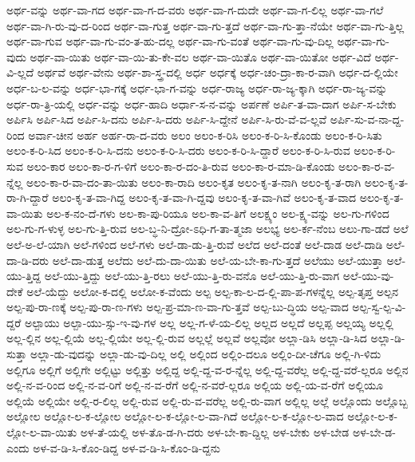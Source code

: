 {ಅರ್ಥ-ವನ್ನು
ಅರ್ಥ-ವಾ-ಗದ
ಅರ್ಥ-ವಾ-ಗ-ದ-ವರು
ಅರ್ಥ-ವಾ-ಗ-ದುದೇ
ಅರ್ಥ-ವಾ-ಗ-ಲಿಲ್ಲ
ಅರ್ಥ-ವಾ-ಗಲೆ
ಅರ್ಥ-ವಾ-ಗಿ-ರು-ವು-ದ-ರಿಂದ
ಅರ್ಥ-ವಾ-ಗುತ್ತ
ಅರ್ಥ-ವಾ-ಗು-ತ್ತದೆ
ಅರ್ಥ-ವಾ-ಗು-ತ್ತಾ-ನೆಯೇ
ಅರ್ಥ-ವಾ-ಗು-ತ್ತಿಲ್ಲ
ಅರ್ಥ-ವಾ-ಗುವ
ಅರ್ಥ-ವಾ-ಗು-ವಂ-ತ-ಹು-ದಲ್ಲ
ಅರ್ಥ-ವಾ-ಗು-ವಂತೆ
ಅರ್ಥ-ವಾ-ಗು-ವು-ದಿಲ್ಲ
ಅರ್ಥ-ವಾ-ಗು-ವುದು
ಅರ್ಥ-ವಾ-ಯಿತು
ಅರ್ಥ-ವಾ-ಯಿ-ತು-ಕೇ-ವಲ
ಅರ್ಥ-ವಾ-ಯಿತೊ
ಅರ್ಥ-ವಾ-ಯಿತೋ
ಅರ್ಥ-ವಿದೆ
ಅರ್ಥ-ವಿ-ಲ್ಲದೆ
ಅರ್ಥವೆ
ಅರ್ಥ-ವೇನು
ಅರ್ಥ-ಶಾ-ಸ್ತ್ರ-ದಲ್ಲಿ
ಅರ್ಧ
ಅರ್ಧಕ್ಕೆ
ಅರ್ಧ-ಚಂ-ದ್ರಾ-ಕಾ-ರ-ವಾಗಿ
ಅರ್ಧ-ದ-ಲ್ಲಿಯೇ
ಅರ್ಧ-ಬ-ಲ-ವನ್ನು
ಅರ್ಧ-ಭಾ-ಗಕ್ಕೆ
ಅರ್ಧ-ಭಾ-ಗ-ವನ್ನು
ಅರ್ಧ-ರಾಜ್ಯ
ಅರ್ಧ-ರಾ-ಜ್ಯ-ಕ್ಕಾಗಿ
ಅರ್ಧ-ರಾ-ಜ್ಯ-ವನ್ನು
ಅರ್ಧ-ರಾ-ತ್ರಿ-ಯಲ್ಲಿ
ಅರ್ಧ-ವನ್ನು
ಅರ್ಧ-ಹಾದಿ
ಅರ್ಧಾ-ಸ-ನ-ವನ್ನು
ಅರ್ಪಣೆ
ಅರ್ಪಿ-ತ-ವಾ-ದಾಗ
ಅರ್ಪಿ-ಸ-ಬೇಕು
ಅರ್ಪಿಸಿ
ಅರ್ಪಿ-ಸಿದ
ಅರ್ಪಿ-ಸಿ-ದನು
ಅರ್ಪಿ-ಸಿ-ದರು
ಅರ್ಪಿ-ಸಿ-ದ್ದೇನೆ
ಅರ್ಪಿ-ಸಿ-ರು-ವೆ-ವ-ಲ್ಲವೆ
ಅರ್ಪಿ-ಸು-ವ-ನಾ-ದ್ದ-ರಿಂದ
ಅರ್ವಾ-ಚೀನ
ಅರ್ಹ
ಅರ್ಹ-ರಾ-ದ-ವರು
ಅಲಂ
ಅಲಂ-ಕ-ರಿಸಿ
ಅಲಂ-ಕ-ರಿ-ಸಿ-ಕೊಂಡು
ಅಲಂ-ಕ-ರಿ-ಸಿತು
ಅಲಂ-ಕ-ರಿ-ಸಿದ
ಅಲಂ-ಕ-ರಿ-ಸಿ-ದನು
ಅಲಂ-ಕ-ರಿ-ಸಿ-ದರು
ಅಲಂ-ಕ-ರಿ-ಸಿ-ದ್ದಾರೆ
ಅಲಂ-ಕ-ರಿ-ಸಿ-ರುವ
ಅಲಂ-ಕ-ರಿ-ಸುವ
ಅಲಂ-ಕಾರ
ಅಲಂ-ಕಾ-ರ-ಗ-ಳಿಗೆ
ಅಲಂ-ಕಾ-ರ-ದಂ-ತಿ-ರುವ
ಅಲಂ-ಕಾ-ರ-ಮಾ-ಡಿ-ಕೊಂಡು
ಅಲಂ-ಕಾ-ರ-ವ-ನ್ನೆಲ್ಲ
ಅಲಂ-ಕಾ-ರ-ವಾ-ದಂ-ತಾ-ಯಿತು
ಅಲಂ-ಕಾ-ರಾದಿ
ಅಲಂ-ಕೃತ
ಅಲಂ-ಕೃ-ತ-ನಾಗಿ
ಅಲಂ-ಕೃ-ತ-ರಾಗಿ
ಅಲಂ-ಕೃ-ತ-ರಾ-ಗಿ-ದ್ದಾರೆ
ಅಲಂ-ಕೃ-ತ-ವಾ-ಗಿದ್ದ
ಅಲಂ-ಕೃ-ತ-ವಾ-ಗಿ-ದ್ದವು
ಅಲಂ-ಕೃ-ತ-ವಾ-ಗಿವೆ
ಅಲಂ-ಕೃ-ತ-ವಾದ
ಅಲಂ-ಕೃ-ತ-ವಾ-ಯಿತು
ಅಲ-ಕ-ನಂ-ದೆ-ಗಳು
ಅಲ-ಕಾ-ಪು-ರಿಯೂ
ಅಲ-ಕಾ-ವ-ತಿಗೆ
ಅಲಕ್ಷ್ಯಂ
ಅಲ-ಕ್ಷ್ಯ-ವನ್ನು
ಅಲ-ಗು-ಗಳಿಂದ
ಅಲ-ಗು-ಗ-ಳುಳ್ಳ
ಅಲ-ಗು-ತ್ತಿ-ರುವ
ಅಲ-ಬ್ಧ-ನಿ-ದ್ರೋ-ಽಧಿ-ಗ-ತಾ-ತ್ಮಜಾ
ಅಲಭ್ಯ
ಅಲ-ರ್ಕ-ನೆಂಬ
ಅಲು-ಗಾ-ಡದೆ
ಅಲೆ
ಅಲೆ-ಅ-ಲೆ-ಯಾಗಿ
ಅಲೆ-ಗಳಿಂದ
ಅಲೆ-ಗಳು
ಅಲೆ-ಡಾ-ಡು-ತ್ತಿ-ರುವೆ
ಅಲೆದ
ಅಲೆ-ದಂತೆ
ಅಲೆ-ದಾಡ
ಅಲೆ-ದಾಡಿ
ಅಲೆ-ದಾ-ಡಿ-ದರು
ಅಲೆ-ದಾ-ಡುತ್ತ
ಅಲೆದು
ಅಲೆ-ದು-ದಾ-ಯಿತು
ಅಲೆ-ಯ-ಬೇ-ಕಾ-ಗು-ತ್ತದೆ
ಅಲೆಯು
ಅಲೆ-ಯುತ್ತಾ
ಅಲೆ-ಯು-ತ್ತಿದ್ದ
ಅಲೆ-ಯು-ತ್ತಿದ್ದು
ಅಲೆ-ಯು-ತ್ತಿ-ರಲು
ಅಲೆ-ಯು-ತ್ತಿ-ರು-ವನೊ
ಅಲೆ-ಯು-ತ್ತಿ-ರು-ವಾಗ
ಅಲೆ-ಯು-ವು-ದೇಕೆ
ಅಲೆ-ಯೆದ್ದು
ಅಲೋ-ಕ-ದಲ್ಲಿ
ಅಲೋ-ಕ-ವೆಂದು
ಅಲ್ಪ
ಅಲ್ಪ-ಕಾ-ಲ-ದ-ಲ್ಲಿ-ಪಾ-ಪ-ಗಳನ್ನೆಲ್ಲ
ಅಲ್ಪ-ತೃಪ್ತ
ಅಲ್ಪನ
ಅಲ್ಪ-ಪು-ರಾ-ಣಕ್ಕೆ
ಅಲ್ಪ-ಪು-ರಾ-ಣ-ಗಳು
ಅಲ್ಪ-ಪ್ರ-ಮಾ-ಣ-ವಾ-ಗು-ತ್ತವೆ
ಅಲ್ಪ-ಬು-ದ್ಧಿಯ
ಅಲ್ಪ-ವಾದ
ಅಲ್ಪ-ಸ್ವ-ಲ್ಪ-ವಿ-ದ್ದರೆ
ಅಲ್ಪಾಯು
ಅಲ್ಪಾ-ಯು-ಸ್ಸು-ಇ-ವು-ಗಳ
ಅಲ್ಲ
ಅಲ್ಲ-ಗ-ಳೆ-ಯ-ಲಿಲ್ಲ
ಅಲ್ಲದ
ಅಲ್ಲದೆ
ಅಲ್ಲಪ್ಪ
ಅಲ್ಲಯ್ಯ
ಅಲ್ಲಲ್ಲಿ
ಅಲ್ಲ-ಲ್ಲಿನ
ಅಲ್ಲ-ಲ್ಲಿಯೆ
ಅಲ್ಲ-ಲ್ಲಿಯೇ
ಅಲ್ಲ-ಲ್ಲಿ-ರುವ
ಅಲ್ಲಲ್ಲೆ
ಅಲ್ಲವೆ
ಅಲ್ಲವೋ
ಅಲ್ಲಾ-ಡಿಸಿ
ಅಲ್ಲಾ-ಡಿ-ಸಿದ
ಅಲ್ಲಾ-ಡಿ-ಸುತ್ತಾ
ಅಲ್ಲಾ-ಡು-ವುದನ್ನು
ಅಲ್ಲಾ-ಡು-ವು-ದಿಲ್ಲ
ಅಲ್ಲಿ
ಅಲ್ಲಿಂದ
ಅಲ್ಲಿಂ-ದಲೂ
ಅಲ್ಲಿಂ-ದೀ-ಚೆಗೂ
ಅಲ್ಲಿ-ಗಿ-ಳಿದು
ಅಲ್ಲಿಗೂ
ಅಲ್ಲಿಗೆ
ಅಲ್ಲಿಗೇ
ಅಲ್ಲಿಟ್ಟು
ಅಲ್ಲಿತ್ತು
ಅಲ್ಲಿದ್ದ
ಅಲ್ಲಿ-ದ್ದ-ವ-ರ-ನ್ನೆಲ್ಲ
ಅಲ್ಲಿ-ದ್ದ-ವರೆಲ್ಲ
ಅಲ್ಲಿ-ದ್ದ-ವರೆ-ಲ್ಲರೂ
ಅಲ್ಲಿನ
ಅಲ್ಲಿ-ನ-ವ-ರಿಂದ
ಅಲ್ಲಿ-ನ-ವ-ರಿಗೆ
ಅಲ್ಲಿ-ನ-ವ-ರೆಗೆ
ಅಲ್ಲಿ-ನ-ವರೆ-ಲ್ಲರೂ
ಅಲ್ಲಿಯ
ಅಲ್ಲಿ-ಯ-ವ-ರೆಗೆ
ಅಲ್ಲಿಯೂ
ಅಲ್ಲಿಯೆ
ಅಲ್ಲಿಯೇ
ಅಲ್ಲಿ-ರ-ಲಿಲ್ಲ
ಅಲ್ಲಿ-ರುವ
ಅಲ್ಲಿ-ರು-ವ-ವರೆಲ್ಲ
ಅಲ್ಲಿ-ರು-ವಾಗ
ಅಲ್ಲಿಲ್ಲ
ಅಲ್ಲೆ
ಅಲ್ಲೊಂದು
ಅಲ್ಲೊಬ್ಬ
ಅಲ್ಲೋಲ
ಅಲ್ಲೋ-ಲ-ಕ-ಲ್ಲೋಲ
ಅಲ್ಲೋ-ಲ-ಕ-ಲ್ಲೋ-ಲ-ವಾ-ಗಿದೆ
ಅಲ್ಲೋ-ಲ-ಕ-ಲ್ಲೋ-ಲ-ವಾದ
ಅಲ್ಲೋ-ಲ-ಕ-ಲ್ಲೋ-ಲ-ವಾ-ಯಿತು
ಅಳ-ತೆ-ಯಲ್ಲಿ
ಅಳ-ತೊ-ಡ-ಗಿ-ದರು
ಅಳ-ಬೇ-ಕಾ-ದ್ದಿಲ್ಲ
ಅಳ-ಬೇಕು
ಅಳ-ಬೇಡ
ಅಳ-ಬೇ-ಡ-ಎಂದು
ಅಳ-ವ-ಡಿ-ಸಿ-ಕೊಂ-ಡಿದ್ದ
ಅಳ-ವ-ಡಿ-ಸಿ-ಕೊಂ-ಡಿ-ದ್ದನು
}
